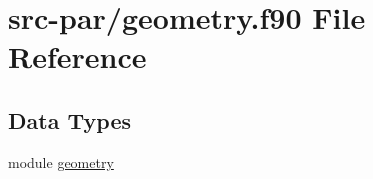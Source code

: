 \hypertarget{geometry_8f90}{\section{src-\/par/geometry.f90 File Reference}
\label{geometry_8f90}
}
\subsection*{Data Types}
\begin{DoxyCompactItemize}
\item 
module \hyperlink{classgeometry}{geometry}
\end{DoxyCompactItemize}
